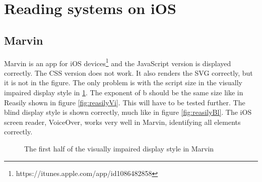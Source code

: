 \section{Reading systems on iOS}
\subsection{Marvin}


Marvin is an app for iOS devices\footnote{https://itunes.apple.com/app/id1086482858} and the JavaScript version is displayed correctly. The CSS version does not work. It also renders the SVG correctly, but it is not in the figure. The only problem is with the script size in the visually impaired display style in \ref{fig:marvinVi}. The exponent of b should be the same size like in Reasily shown in figure \ref{fig:reasilyVi}. This will have to be tested further. The blind display style is shown correctly, much like in figure \ref{fig:reasilyBl}. The iOS screen reader, VoiceOver, works very well in Marvin, identifying all elements correctly.

\begin{figure}[H]
	\centering
	\caption{The first half of the visually impaired display style in Marvin}
	\label{fig:marvinVi}
\end{figure}

